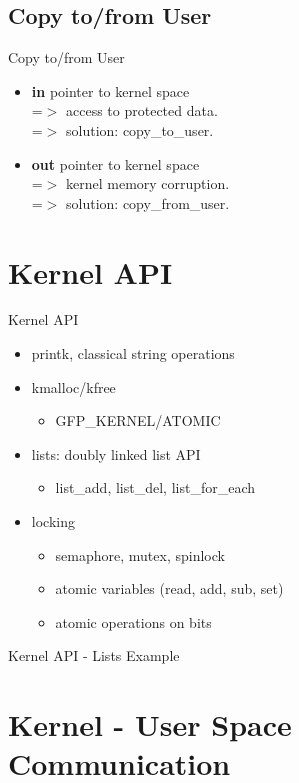 \documentclass{workshop}
\begin{document}
\subsection{Copy to/from User}
\begin{frame}{Copy to/from User}
\begin{itemize}
\item \textbf{in} pointer to kernel space\\
=$>$ access to protected data.\\
=$>$ solution: copy\_to\_user.
\item \textbf{out} pointer to kernel space\\
=$>$ kernel memory corruption.\\
=$>$ solution: copy\_from\_user.
\end{itemize}
\end{frame}

\section{Kernel API}
\begin{frame}{Kernel API}
\begin{itemize}
\item printk, classical string operations
\item kmalloc/kfree
\begin{itemize}
\item GFP\_KERNEL/ATOMIC
\end{itemize}
\item lists: doubly linked list API
\begin{itemize}
\item list\_add, list\_del, list\_for\_each
\end{itemize}
\item locking
\begin{itemize}
\item semaphore, mutex, spinlock
\item atomic variables (read, add, sub, set)
\item atomic operations on bits
\end{itemize}
\end{itemize}
\end{frame}

\begin{frame}{Kernel API - Lists Example}

\end{frame}

\section{Kernel - User Space Communication}
\end{document}
